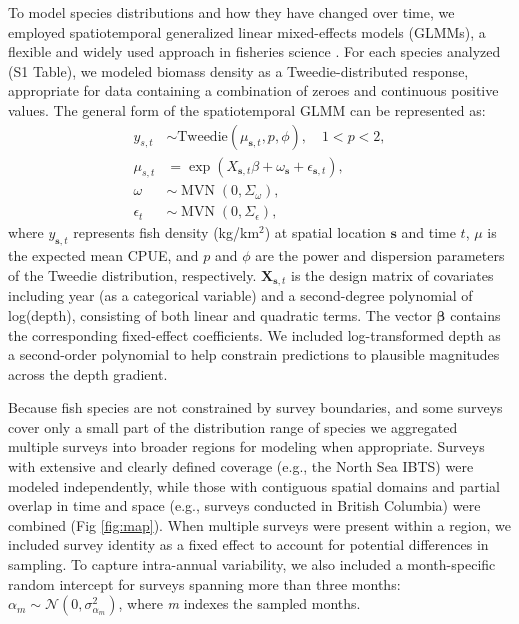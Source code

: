 \documentclass[11pt]{article}
\begin{document}
\begin{spacing}{1.5}
To model species distributions and how they have changed over time, we employed spatiotemporal generalized linear mixed-effects models (GLMMs), a flexible and widely used approach in fisheries science \citep{thorson_geostatistical_2015, thorson_model-based_2016}. For each species analyzed (S1 Table), we modeled biomass density as a Tweedie-distributed response, appropriate for data containing a combination of zeroes and continuous positive values. 
The general form of the spatiotemporal GLMM can be represented as:
\begin{align}
    y_{s,t} &\sim \text{Tweedie} \left( \mu_{\boldsymbol{s},t}, p, \phi \right), \quad 1 < p < 2, \label{eq:1} \\
    \mu_{s,t} &= \exp \left( X_{\boldsymbol{s},t} \beta + \omega_{\boldsymbol{s}} + \epsilon_{\boldsymbol{s},t} \right), \label{eq:2} \\
    \omega &\sim \operatorname{MVN} \left(0, \Sigma_{\omega} \right), \label{eq:3} \\
    \epsilon_{t} &\sim \operatorname{MVN} \left(0, \Sigma_{\epsilon} \right), \label{eq:4}
\end{align}
where \( y_{\mathbf{s},t} \) represents fish density (kg/km\(^2\)) at spatial location \( \mathbf{s} \) and time \( t \), \( \mu \) is the expected mean CPUE, and \( p \) and \( \phi \) are the power and dispersion parameters of the Tweedie distribution, respectively. \( \mathbf{X}_{\mathbf{s},t} \) is the design matrix of covariates including year (as a categorical variable) and a second-degree polynomial of log(depth), consisting of both linear and quadratic terms. The vector \( \bm{\beta} \) contains the corresponding fixed-effect coefficients.
We included log-transformed depth as a second-order polynomial to help constrain predictions to plausible magnitudes across the depth gradient.

Because fish species are not constrained by survey boundaries, and some surveys cover only a small part of the distribution range of species we aggregated multiple surveys into broader regions for modeling when appropriate. Surveys with extensive and clearly defined coverage (e.g., the North Sea IBTS) were modeled independently, while those with contiguous spatial domains and partial overlap in time and space (e.g., surveys conducted in British Columbia) were combined (Fig \ref{fig:map}). When multiple surveys were present within a region, we included survey identity as a fixed effect to account for potential differences in sampling. To capture intra-annual variability, we also included a month-specific random intercept for surveys spanning more than three months: $\alpha_m \sim \mathcal{N}(0, \sigma_{\alpha_m}^{2})$, where \textit{m} indexes the sampled months.


\end{spacing}
\end{document}
